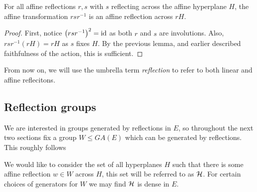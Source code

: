 \documentclass[../main.tex]{subfiles}
\begin{document}
\begin{proposition}
    For all affine reflections $r,s$ with $s$ reflecting across the affine hyperplane $H$, the affine transformation $rsr^{-1}$ is an affine reflection across $rH$.
    \begin{proof}
        First, notice $\left( rsr^{-1} \right)^2 = \text{id}$ as both $r$ and $s$ are involutions. Also, $rsr^{-1}(rH) = rH$ as $s$ fixes $H$. By the previous lemma, and earlier described faithfulness of the action, this is sufficient. 
    \end{proof}
\end{proposition}

From now on, we will use the umbrella term \textit{reflection} to refer to both linear and affine reflecitons.

\subsection{Reflection groups}\label{subsection:reflection groups}
We are interested in groups generated by reflections in $E$, so throughout the next two sections fix a group $W\leq GA(E)$ which can be generated by reflections. This roughly follows~\cite{Humphreys1990}

We would like to consider the set of all hyperplanes $H$ such that there is some affine reflection $w\in W$ across $H$, this set will be referred to as $\mathcal{H}$. For certain choices of generators for $W$ we may find $\mathcal{H}$ is dense in $E$.
\end{document}
